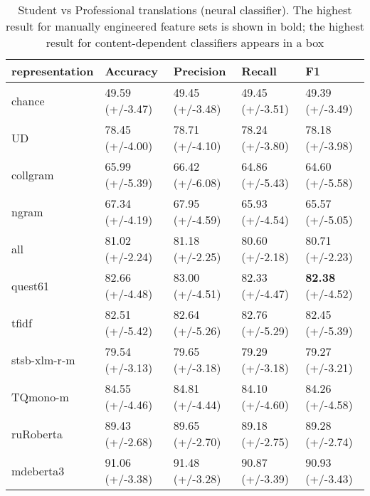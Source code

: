 \begin{table}[H]
	\centering
	\begin{tabular}{l|llll}
		\toprule
		representation & Accuracy        & Precision       & Recall          & F1              \\
		\midrule
		chance          & 49.59 (+/-3.47) & 49.45 (+/-3.48) & 49.45 (+/-3.51) & 49.39 (+/-3.49) \\
		\midrule
		UD              & 78.45 (+/-4.00) & 78.71 (+/-4.10) & 78.24 (+/-3.80) & 78.18 (+/-3.98) \\
		collgram        & 65.99 (+/-5.39) & 66.42 (+/-6.08) & 64.86 (+/-5.43) & 64.60 (+/-5.58) \\
		ngram           & 67.34 (+/-4.19) & 67.95 (+/-4.59) & 65.93 (+/-4.54) & 65.57 (+/-5.05) \\
		all             & 81.02 (+/-2.24) & 81.18 (+/-2.25) & 80.60 (+/-2.18) & 80.71 (+/-2.23) \\
		quest61         & 82.66 (+/-4.48) & 83.00 (+/-4.51) & 82.33 (+/-4.47) & \textbf{82.38} (+/-4.52) \\
		\midrule
		tfidf           & 82.51 (+/-5.42) & 82.64 (+/-5.26) & 82.76 (+/-5.29) & 82.45 (+/-5.39) \\
		stsb-xlm-r-m          & 79.54 (+/-3.13) & 79.65 (+/-3.18) & 79.29 (+/-3.18) & 79.27 (+/-3.21) \\
		TQmono-m        & 84.55 (+/-4.46) & 84.81 (+/-4.44) & 84.10 (+/-4.60) & 84.26 (+/-4.58) \\
		ruRoberta & 89.43 (+/-2.68) & 89.65 (+/-2.70) & 89.18 (+/-2.75) & 89.28 (+/-2.74) \\
		mdeberta3  & 91.06 (+/-3.38) & 91.48 (+/-3.28) & 90.87 (+/-3.39) & \boxit{0.4in}90.93 (+/-3.43) \\
	\bottomrule
	\end{tabular}
\caption{\label{tab:stu-pro_neu}Student vs Professional translations (neural classifier). The highest result for manually engineered feature sets is shown in bold; the highest result for content-dependent classifiers appears in a box}
\end{table}


